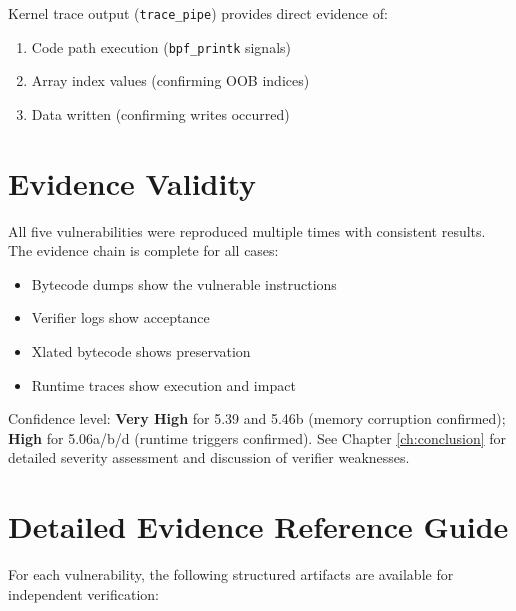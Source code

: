 Kernel trace output (\texttt{trace\_pipe}) provides direct evidence of:
\begin{enumerate}[label=\arabic*.]
  \item Code path execution (\texttt{bpf\_printk} signals)
  \item Array index values (confirming OOB indices)
  \item Data written (confirming writes occurred)
\end{enumerate}



\section{Evidence Validity}

All five vulnerabilities were reproduced multiple times with consistent results. The evidence chain is complete for all cases:
\begin{itemize}
  \item Bytecode dumps show the vulnerable instructions
  \item Verifier logs show acceptance
  \item Xlated bytecode shows preservation
  \item Runtime traces show execution and impact
\end{itemize}

Confidence level: \textbf{Very High} for 5.39 and 5.46b (memory corruption confirmed); \textbf{High} for 5.06a/b/d (runtime triggers confirmed). See Chapter \ref{ch:conclusion} for detailed severity assessment and discussion of verifier weaknesses.

\section{Detailed Evidence Reference Guide}

For each vulnerability, the following structured artifacts are available for independent verification:

